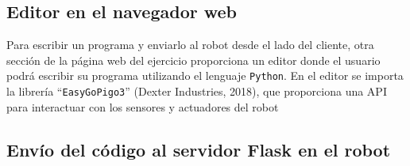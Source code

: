 \subsection{Editor en el navegador web}

Para escribir un programa y enviarlo al robot desde el lado del cliente, otra sección de la página web del ejercicio proporciona un editor donde el usuario podrá escribir su programa utilizando el lenguaje \texttt{Python}. En el editor se importa la librería “\texttt{EasyGoPigo3}” (Dexter Industries, 2018), que proporciona una API para interactuar con los sensores y actuadores del robot 

\subsection{Envío del código al servidor Flask en el robot}

